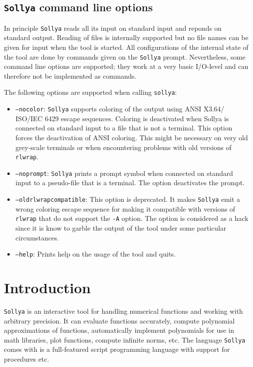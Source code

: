 \documentclass[a4paper]{article}
\newcommand{\sollya}{\texttt{Sollya}\xspace}
\begin{document}
\subsection{\sollya command line options}

In principle \sollya reads all its input on standard input and reponds
on standard output. Reading of files is internally supported but no
file names can be given for input when the tool is started. All
configurations of the internal state of the tool are done by commands
given on the \sollya prompt. Nevertheless, some command line options
are supported; they work at a very basic I/O-level and can therefore
not be implemented as commands. 

The following options are supported when calling \texttt{sollya}:
\begin{itemize}
\item \texttt{--nocolor}: \sollya supports coloring of the output
  using ANSI X3.64/ ISO/IEC 6429 escape sequences. Coloring is
  deactivated when Sollya is connected on standard input to a file
  that is not a terminal. This option forces the deactivation of ANSI
  coloring. This might be necessary on very old grey-scale terminals or when
  encountering problems with old versions of \texttt{rlwrap}. 
\item \texttt{--noprompt}: \sollya prints a prompt symbol when
  connected on standard input to a pseudo-file that is a terminal. The
  option deactivates the prompt.
\item \texttt{--oldrlwrapcompatible}: This option is deprecated. It
  makes \sollya emit a wrong coloring escape sequence for making it
  compatible with versions of \texttt{rlwrap} that do not support the
  \texttt{-A} option. The option is considered as a hack since it is
  know to garble the output of the tool under some particular
  circumstances.
\item \texttt{--help}: Prints help on the usage of the tool and quits.
\end{itemize}


\section{Introduction}
\sollya is an interactive tool for handling numerical functions and working with arbitrary precision. It can evaluate functions accurately, compute polynomial approximations of functions, automatically implement polynomials for use in math libraries, plot functions, compute infinite norms, etc. The language \sollya comes with is a full-featured script programming language with support for procedures etc. 
\end{document}
